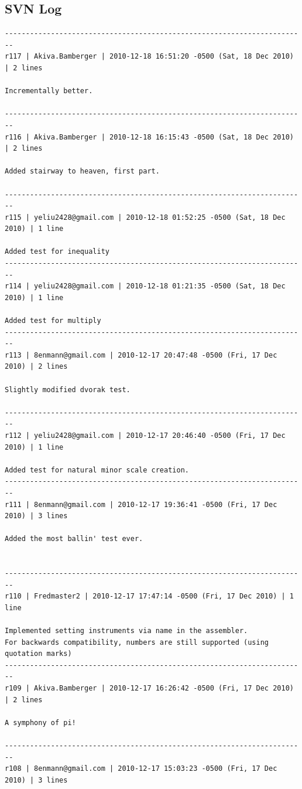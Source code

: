 \documentclass[12pt,A4]{book}
\begin{document}
\subsection{SVN Log}
\begin{verbatim}
------------------------------------------------------------------------
r117 | Akiva.Bamberger | 2010-12-18 16:51:20 -0500 (Sat, 18 Dec 2010) | 2 lines

Incrementally better.

------------------------------------------------------------------------
r116 | Akiva.Bamberger | 2010-12-18 16:15:43 -0500 (Sat, 18 Dec 2010) | 2 lines

Added stairway to heaven, first part.

------------------------------------------------------------------------
r115 | yeliu2428@gmail.com | 2010-12-18 01:52:25 -0500 (Sat, 18 Dec 2010) | 1 line

Added test for inequality
------------------------------------------------------------------------
r114 | yeliu2428@gmail.com | 2010-12-18 01:21:35 -0500 (Sat, 18 Dec 2010) | 1 line

Added test for multiply
------------------------------------------------------------------------
r113 | 8enmann@gmail.com | 2010-12-17 20:47:48 -0500 (Fri, 17 Dec 2010) | 2 lines

Slightly modified dvorak test.

------------------------------------------------------------------------
r112 | yeliu2428@gmail.com | 2010-12-17 20:46:40 -0500 (Fri, 17 Dec 2010) | 1 line

Added test for natural minor scale creation.
------------------------------------------------------------------------
r111 | 8enmann@gmail.com | 2010-12-17 19:36:41 -0500 (Fri, 17 Dec 2010) | 3 lines

Added the most ballin' test ever.


------------------------------------------------------------------------
r110 | Fredmaster2 | 2010-12-17 17:47:14 -0500 (Fri, 17 Dec 2010) | 1 line

Implemented setting instruments via name in the assembler.
For backwards compatibility, numbers are still supported (using quotation marks)
------------------------------------------------------------------------
r109 | Akiva.Bamberger | 2010-12-17 16:26:42 -0500 (Fri, 17 Dec 2010) | 2 lines

A symphony of pi!

------------------------------------------------------------------------
r108 | 8enmann@gmail.com | 2010-12-17 15:03:23 -0500 (Fri, 17 Dec 2010) | 3 lines


\end{verbatim}
\end{document}
